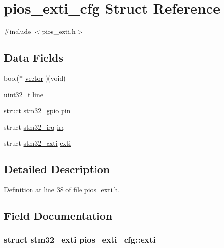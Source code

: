 \hypertarget{structpios__exti__cfg}{\section{pios\-\_\-exti\-\_\-cfg \-Struct \-Reference}
\label{structpios__exti__cfg}
}


{\ttfamily \#include $<$pios\-\_\-exti.\-h$>$}

\subsection*{\-Data \-Fields}
\begin{DoxyCompactItemize}
\item 
bool($\ast$ \hyperlink{structpios__exti__cfg_a7fb58b83fd0a79e8aa956a683317723c}{vector} )(void)
\item 
uint32\-\_\-t \hyperlink{structpios__exti__cfg_ac8acb6d5a45610f65ed2eb066216694b}{line}
\item 
struct \hyperlink{structstm32__gpio}{stm32\-\_\-gpio} \hyperlink{structpios__exti__cfg_a099174bef966c8ee8091cb1d00343a4b}{pin}
\item 
struct \hyperlink{structstm32__irq}{stm32\-\_\-irq} \hyperlink{structpios__exti__cfg_a581dede4e7459e6a9586711e62c3fcc7}{irq}
\item 
struct \hyperlink{structstm32__exti}{stm32\-\_\-exti} \hyperlink{structpios__exti__cfg_a2e23a11b2a84a08143b9e5ac6a3fe36b}{exti}
\end{DoxyCompactItemize}


\subsection{\-Detailed \-Description}


\-Definition at line 38 of file pios\-\_\-exti.\-h.



\subsection{\-Field \-Documentation}
\hypertarget{structpios__exti__cfg_a2e23a11b2a84a08143b9e5ac6a3fe36b}{
\subsubsection[{exti}]{\setlength{\rightskip}{0pt plus 5cm}struct {\bf stm32\-\_\-exti} {\bf pios\-\_\-exti\-\_\-cfg\-::exti}}}\label{structpios__exti__cfg_a2e23a11b2a84a08143b9e5ac6a3fe36b}


